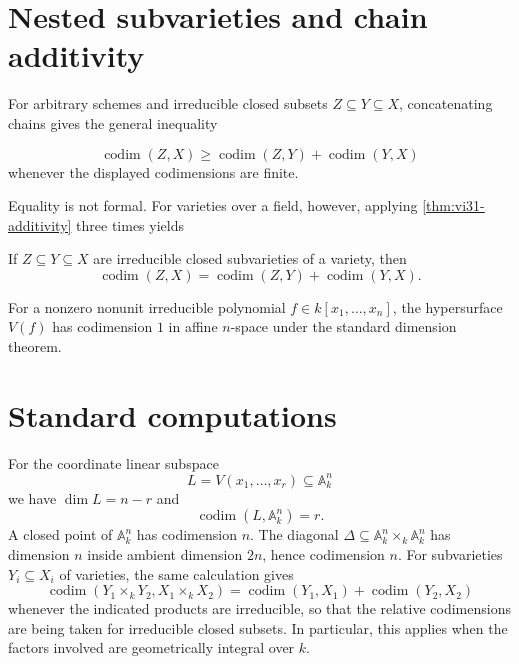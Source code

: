 \section{Nested subvarieties and chain additivity}\label{sec:vi31-nested}
For arbitrary schemes and irreducible closed subsets $Z\subseteq Y\subseteq X$, concatenating chains gives the general
inequality
\begin{proposition}\label{prop:vi31-concatenation}
\[
 \operatorname{codim}(Z,X)\geq
 \operatorname{codim}(Z,Y)+\operatorname{codim}(Y,X)
\]
whenever the displayed codimensions are finite.
\end{proposition}
Equality is not formal.  For varieties over a field, however, applying \cref{thm:vi31-additivity} three times yields
\begin{corollary}\label{cor:vi31-nested-varieties}
If $Z\subseteq Y\subseteq X$ are irreducible closed subvarieties of a variety, then
\[
 \operatorname{codim}(Z,X)=\operatorname{codim}(Z,Y)+\operatorname{codim}(Y,X).
\]
\end{corollary}


\begin{example}[A hypersurface]\label{ex:vi31-expand-03}
For a nonzero nonunit irreducible polynomial $f\in k[x_1,\ldots,x_n]$, the hypersurface $V(f)$ has codimension $1$ in affine $n$-space under the standard dimension theorem.
\end{example}
\section{Standard computations}\label{sec:vi31-computations}
For the coordinate linear subspace
\[
 L=V(x_1,\ldots,x_r)\subseteq\mathbb A^n_k
\]
we have $\dim L=n-r$ and
\[
 \operatorname{codim}(L,\mathbb A^n_k)=r.
\]
A closed point of $\mathbb A^n_k$ has codimension $n$.  The diagonal
$\Delta\subseteq\mathbb A^n_k\times_k\mathbb A^n_k$ has dimension $n$ inside ambient dimension $2n$, hence
codimension $n$.  For subvarieties $Y_i\subseteq X_i$ of varieties, the same calculation gives
\[
 \operatorname{codim}(Y_1\times_k Y_2,X_1\times_k X_2)
 =\operatorname{codim}(Y_1,X_1)+\operatorname{codim}(Y_2,X_2)
\]
whenever the indicated products are irreducible, so that the relative codimensions are being taken for irreducible
closed subsets.  In particular, this applies when the factors involved are geometrically integral over $k$.


